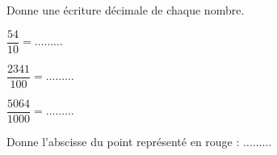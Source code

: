 \begin{pageParcoursu}

Donne une écriture décimale de chaque nombre. 

\begin{minipage}{0.32\linewidth}
 $\dfrac{54}{10} =  \ldots\ldots\ldots$ 
\end{minipage}
\begin{minipage}{0.32\linewidth}
$\dfrac{2341}{100} =  \ldots\ldots\ldots$  
\end{minipage}
\begin{minipage}{0.32\linewidth}
$\dfrac{5064}{1000} =  \ldots\ldots\ldots$   
\end{minipage}
 
 
Donne l'abscisse du point représenté en rouge :  $\ldots\ldots\ldots$
 

\end{pageParcoursu}
